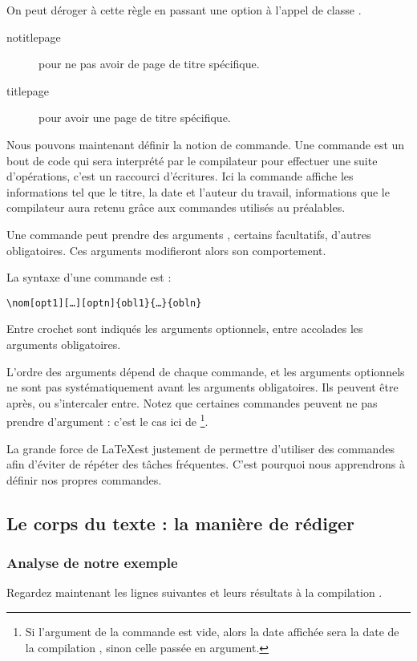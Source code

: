 On peut déroger à cette règle en passant une option à l'appel de classe .
\begin{description}
\item[notitlepage] pour ne pas avoir de page de titre spécifique.
\item[titlepage] pour avoir une page de titre spécifique.
\end{description}

Nous pouvons maintenant définir la notion de commande. Une commande  est un bout de code qui sera interprété par le compilateur pour effectuer une suite d'opérations, c'est un raccourci d'écritures. 
Ici la commande  affiche les informations tel que le titre, la date et l'auteur du travail, informations que le compilateur aura retenu grâce aux commandes utilisés au préalables.

Une commande peut prendre des arguments , certains facultatifs, d'autres obligatoires. Ces arguments  modifieront alors son comportement.

La syntaxe d'une commande est : \label{syntaxecommande}

\begin{verbatim}
\nom[opt1][…][optn]{obl1}{…}{obln}
\end{verbatim}

Entre crochet sont indiqués les arguments optionnels, entre accolades les arguments obligatoires.


L'ordre des arguments dépend de chaque commande, et les arguments optionnels ne sont pas systématiquement avant les arguments obligatoires. Ils peuvent être après, ou s'intercaler entre. Notez que certaines commandes peuvent ne pas prendre d'argument : c'est le cas ici de \footnote{Si l'argument de la commande   est vide, alors la date affichée  sera la date de la compilation , sinon celle passée en argument.}.

La grande force de \LaTeX est justement de permettre d'utiliser des commandes afin d'éviter de répéter des tâches fréquentes. C'est pourquoi nous apprendrons à définir nos propres commandes.



\subsection{Le corps du texte : la manière de rédiger}

\subsubsection{Analyse de notre exemple}
Regardez maintenant les lignes suivantes et leurs résultats à la compilation .


